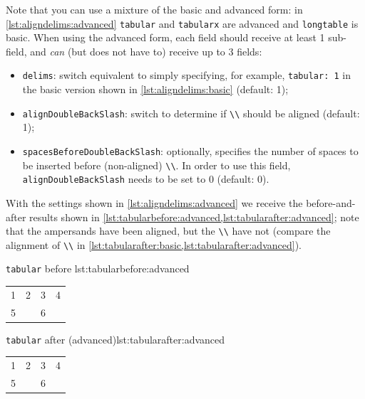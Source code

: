 \documentclass[11pt]{article}
\begin{document}
\begin{itemize}
    Note that you can use a mixture of the basic and advanced form: in \cref{lst:aligndelims:advanced} \lstinline!tabular! and \lstinline!tabularx! 
    are advanced and \lstinline!longtable! is basic. When using the advanced form, each field should receive at least 1 sub-field, and \emph{can} (but does not have to) receive up to 3 fields: 
    \begin{itemize}
      \item \lstinline!delims!: switch equivalent to simply specifying, for example, \lstinline!tabular: 1! in
        the basic version shown in \cref{lst:aligndelims:basic} (default: 1);
      \item \lstinline!alignDoubleBackSlash!: switch to determine if \lstinline!\\! should be aligned (default: 1);
      \item \lstinline!spacesBeforeDoubleBackSlash!: optionally, specifies the number of spaces to be inserted
        before (non-aligned) \lstinline!\\!. In order to use this field, \lstinline!alignDoubleBackSlash! needs
        to be set to 0 (default: 0).
    \end{itemize}
    
    With the settings shown in \cref{lst:aligndelims:advanced} we receive the before-and-after results shown in
    \cref{lst:tabularbefore:advanced,lst:tabularafter:advanced}; note that the ampersands have been aligned, but 
    the \lstinline!\\! have not (compare the alignment of \lstinline!\\! in \cref{lst:tabularafter:basic,lst:tabularafter:advanced}).

	\begin{minipage}{.5\textwidth}
		\begin{cmhlistings}[style=demo,columns=fixed]{\lstinline!tabular! before }{lst:tabularbefore:advanced}
\begin{tabular}{cccc}
1&	2 &3       &4\\
5& &6       &\\
\end{tabular}
		\end{cmhlistings}
	\end{minipage}%
	\begin{minipage}{.5\textwidth}
		\begin{cmhlistings}[style=demo,columns=fixed]{\lstinline!tabular! after (advanced)}{lst:tabularafter:advanced}
\begin{tabular}{cccc}
 1 & 2 & 3 & 4\\
 5 &   & 6 &\\
\end{tabular}
		\end{cmhlistings}
	\end{minipage}


\end{itemize}
\end{document}
